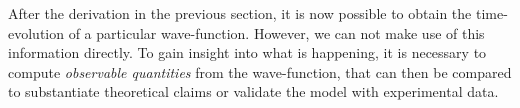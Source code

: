 After the derivation in the previous section, it is now possible to obtain the time-evolution of a particular wave-function.
However, we can not make use of this information directly. 
To gain insight into what is happening, it is necessary to compute \emph{observable quantities} from the wave-function, that can then be compared to substantiate theoretical claims or validate the model with experimental data.